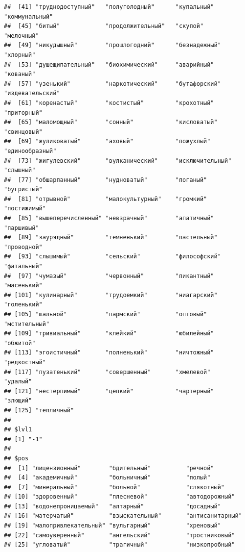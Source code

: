 \documentclass[11pt]{article}\usepackage[]{graphicx}\usepackage[]{color}
\makeatletter
\newenvironment{kframe}{%
 \def\at@end@of@kframe{}%
 \ifinner\ifhmode%
  \def\at@end@of@kframe{\end{minipage}}%
  \begin{minipage}{\columnwidth}%
 \fi\fi%
 \def\FrameCommand##1{\hskip\@totalleftmargin \hskip-\fboxsep
 \colorbox{shadecolor}{##1}\hskip-\fboxsep
     \hskip-\linewidth \hskip-\@totalleftmargin \hskip\columnwidth}%
 \MakeFramed {\advance\hsize-\width
   \@totalleftmargin\z@ \linewidth\hsize
   \@setminipage}}%
 {\par\unskip\endMakeFramed%
 \at@end@of@kframe}
\newenvironment{knitrout}{}{} %
\makeatother
\begin{document}
\begin{knitrout}
\begin{kframe}
\begin{verbatim}
##  [41] "труднодоступный"   "полуголодный"      "купальный"         "коммунальный"     
##  [45] "битый"             "продолжительный"   "скупой"            "мелочный"         
##  [49] "никудышный"        "прошлогодний"      "безнадежный"       "хлорный"          
##  [53] "душещипательный"   "биохимический"     "аварийный"         "кованый"          
##  [57] "узенький"          "наркотический"     "бутафорский"       "издевательский"   
##  [61] "коренастый"        "костистый"         "крохотный"         "приторный"        
##  [65] "маломощный"        "сонный"            "кисловатый"        "свинцовый"        
##  [69] "жуликоватый"       "аховый"            "пожухлый"          "единообразный"    
##  [73] "жигулевский"       "вулканический"     "исключительный"    "слышный"          
##  [77] "обшарпанный"       "нудноватый"        "поганый"           "бугристый"        
##  [81] "отрывной"          "малокультурный"    "громкий"           "постижимый"       
##  [85] "вышеперечисленный" "невзрачный"        "апатичный"         "паршивый"         
##  [89] "заурядный"         "темненький"        "пастельный"        "проводной"        
##  [93] "слышимый"          "сельский"          "философский"       "фатальный"        
##  [97] "чумазый"           "червонный"         "пикантный"         "масенький"        
## [101] "кулинарный"        "трудоемкий"        "ниагарский"        "голенький"        
## [105] "шальной"           "пармский"          "оптовый"           "мстительный"      
## [109] "тривиальный"       "клейкий"           "юбилейный"         "обжитой"          
## [113] "эгоистичный"       "полненький"        "ничтожный"         "редкостный"       
## [117] "пузатенький"       "совершенный"       "хмелевой"          "удалый"           
## [121] "нестерпимый"       "цепкий"            "чартерный"         "злющий"           
## [125] "тепличный"        
## 
## $lvl1
## [1] "-1"
## 
## $pos
##  [1] "лицензионный"        "бдительный"          "речной"             
##  [4] "академичный"         "больничный"          "полый"              
##  [7] "минеральный"         "больной"             "слякотный"          
## [10] "здоровенный"         "плесневой"           "автодорожный"       
## [13] "водонепроницаемый"   "алтарный"            "досадный"           
## [16] "матерчатый"          "взыскательный"       "антисанитарный"     
## [19] "малопривлекательный" "вульгарный"          "хреновый"           
## [22] "самоуверенный"       "ангельский"          "тростниковый"       
## [25] "угловатый"           "трагичный"           "низкопробный"       

\end{verbatim}
\end{kframe}
\end{knitrout}
\end{document}
